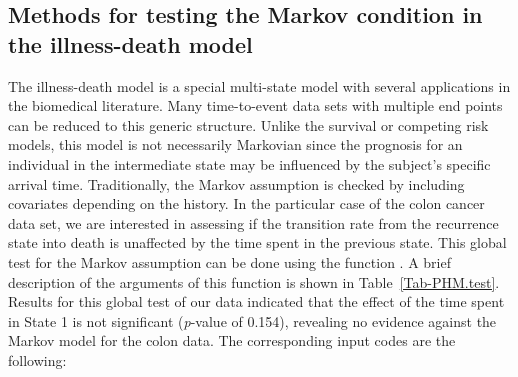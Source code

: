 \subsection{Methods for testing the Markov condition
in the illness-death model} \label{sec:mkv tests1}
The illness-death model is a special multi-state model with several applications in the biomedical literature. Many time-to-event data sets with multiple end points can be reduced to this generic structure. Unlike the survival or competing risk models, this model is not necessarily Markovian since the prognosis for an individual in the intermediate state may be influenced by the subject's specific arrival time. Traditionally, the Markov assumption is checked by including covariates depending on the history. In the particular case of the colon cancer data set, we are interested in assessing if the transition rate from the recurrence state into death is unaffected by the time spent in the previous state. This global test for the Markov assumption can be done using the function . A brief description of the arguments of this function is shown in Table~\ref{Tab-PHM.test}. Results for this global test of our data indicated that the effect of the time spent in State 1 is not significant (\textit{p}-value of 0.154), revealing no evidence against the Markov model for the colon data. The corresponding input codes are the following:



